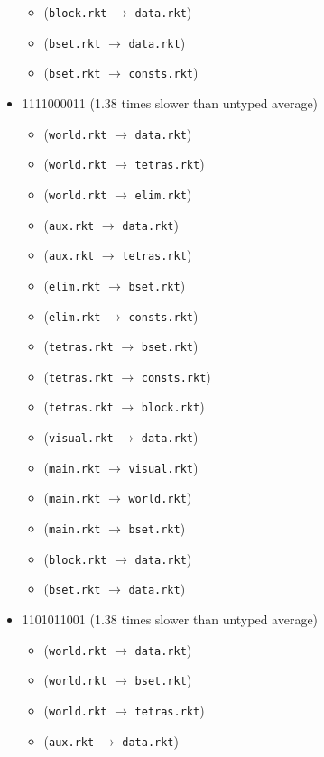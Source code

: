 \documentclass{article}
\newcommand{\mono}[1]{\texttt{#1}}
\begin{document}
\begin{itemize}
\begin{itemize}
  \item (\mono{block.rkt} $\rightarrow$ \mono{data.rkt})
  \item (\mono{bset.rkt} $\rightarrow$ \mono{data.rkt})
  \item (\mono{bset.rkt} $\rightarrow$ \mono{consts.rkt})
  \end{itemize}
\item 1111000011 (1.38 times slower than untyped average)
  \begin{itemize}
  \item (\mono{world.rkt} $\rightarrow$ \mono{data.rkt})
  \item (\mono{world.rkt} $\rightarrow$ \mono{tetras.rkt})
  \item (\mono{world.rkt} $\rightarrow$ \mono{elim.rkt})
  \item (\mono{aux.rkt} $\rightarrow$ \mono{data.rkt})
  \item (\mono{aux.rkt} $\rightarrow$ \mono{tetras.rkt})
  \item (\mono{elim.rkt} $\rightarrow$ \mono{bset.rkt})
  \item (\mono{elim.rkt} $\rightarrow$ \mono{consts.rkt})
  \item (\mono{tetras.rkt} $\rightarrow$ \mono{bset.rkt})
  \item (\mono{tetras.rkt} $\rightarrow$ \mono{consts.rkt})
  \item (\mono{tetras.rkt} $\rightarrow$ \mono{block.rkt})
  \item (\mono{visual.rkt} $\rightarrow$ \mono{data.rkt})
  \item (\mono{main.rkt} $\rightarrow$ \mono{visual.rkt})
  \item (\mono{main.rkt} $\rightarrow$ \mono{world.rkt})
  \item (\mono{main.rkt} $\rightarrow$ \mono{bset.rkt})
  \item (\mono{block.rkt} $\rightarrow$ \mono{data.rkt})
  \item (\mono{bset.rkt} $\rightarrow$ \mono{data.rkt})
  \end{itemize}
\item 1101011001 (1.38 times slower than untyped average)
  \begin{itemize}
  \item (\mono{world.rkt} $\rightarrow$ \mono{data.rkt})
  \item (\mono{world.rkt} $\rightarrow$ \mono{bset.rkt})
  \item (\mono{world.rkt} $\rightarrow$ \mono{tetras.rkt})
  \item (\mono{aux.rkt} $\rightarrow$ \mono{data.rkt})

\end{itemize}
\end{itemize}
\end{document}
